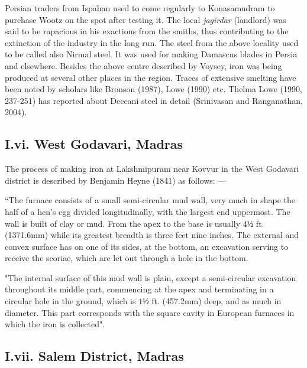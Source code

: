 Persian traders from Ispahan used to come regularly to Konasamudram to purchase Wootz on the spot after testing it.  The local {\it jagirdar} (landlord) was said to be rapacious in his exactions from the smiths, thus contributing to the extinction of the industry in the long run. The steel from the above locality used to be called also Nirmal steel. It was used for making Damascus blades in Persia and elsewhere. Besides the above centre described by Voysey, iron was being produced at several other places in the region. Traces of extensive smelting have been noted by scholars like Bronson (1987), Lowe (1990) etc. Thelma Lowe (1990, 237-251) has reported about Deccani steel in detail (Srinivasan and Ranganathan, 2004).   

\subsection*{I.vi. West Godavari, Madras}\label{subsection-6}

The process of making iron at Lakshmipuram near Kovvur in the West Godavari district is described by Benjamin Heyne (1841) as follows: — 

“The furnace consists of a small semi-circular mud wall, very much in shape the half of a hen’s egg divided longitudinally, with the largest end uppermost. The wall is built of clay or mud. From the apex to the base is usually $4½$ ft. (1371.6mm) while its greatest breadth is three feet nine inches. The external and convex surface has on one of its sides, at the bottom, an excavation serving to receive the scoriae, which are let out through a hole in the bottom.

"The internal surface of this mud wall is plain, except a semi-circular excavation throughout its middle part, commencing at the apex and terminating in a circular hole in the ground, which is $1½$ ft. (457.2mm) deep, and as much in diameter. This part corresponds with the square cavity in European furnaces in which the iron is collected". 

\subsection*{I.vii.  Salem District, Madras}\label{subsection-7}

